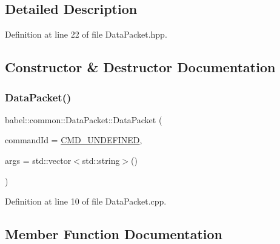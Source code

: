\subsection{Detailed Description}


Definition at line 22 of file Data\+Packet.\+hpp.



\subsection{Constructor \& Destructor Documentation}
\mbox{\label{classbabel_1_1common_1_1_data_packet_a860ff3cd9e290b5b22efaf4f73c1cf1c}} 
\subsubsection{\texorpdfstring{Data\+Packet()}{DataPacket()}}
{\footnotesize\ttfamily babel\+::common\+::\+Data\+Packet\+::\+Data\+Packet (\begin{DoxyParamCaption}\item[{\mbox{\hyperlink{namespacebabel_1_1common_a2d31f246c776da6bf656bd71e86cbb2c}{Command\+Name}}}]{command\+Id = {\ttfamily \mbox{\hyperlink{namespacebabel_1_1common_a2d31f246c776da6bf656bd71e86cbb2ca452461e4930e2af5d48e5d2f3eecf98f}{C\+M\+D\+\_\+\+U\+N\+D\+E\+F\+I\+N\+ED}}},  }\item[{const std\+::vector$<$ std\+::string $>$ \&}]{args = {\ttfamily std\+:\+:vector$<$std\+:\+:string$>$()} }\end{DoxyParamCaption})}



Definition at line 10 of file Data\+Packet.\+cpp.



\subsection{Member Function Documentation}
\mbox{\label{classbabel_1_1common_1_1_data_packet_a5fa7533d1b80455b7400286ecef769d2}} 
